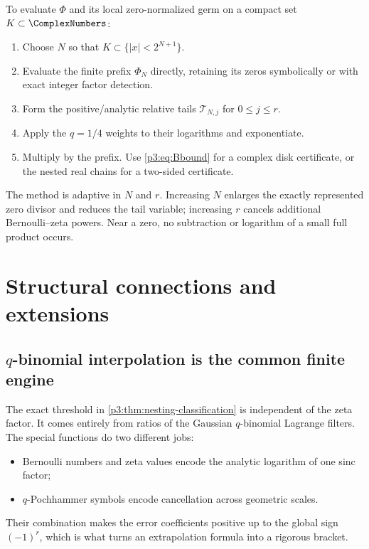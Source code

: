 \documentclass[11pt]{article}
\numberwithin{equation}{section}
\theoremstyle{definition}
\theoremstyle{remark}
\begin{document}
\begin{algorithm}\label{p3:alg:evaluator}
To evaluate $\Phi$ and its local zero-normalized germ on a compact set $K\subset\ComplexNumbers$:
\begin{enumerate}
\item Choose $N$ so that $K\subset\{|x|<2^{N+1}\}$.
\item Evaluate the finite prefix $\Phi_N$ directly, retaining its zeros symbolically or with
      exact integer factor detection.
\item Form the positive/analytic relative tails $\mathcal T_{N,j}$ for $0\le j\le r$.
\item Apply the $q=1/4$ weights to their logarithms and exponentiate.
\item Multiply by the prefix.  Use \eqref{p3:eq:Bbound} for a complex disk certificate, or the
      nested real chains for a two-sided certificate.
\end{enumerate}
\end{algorithm}

The method is adaptive in $N$ and $r$.  Increasing $N$ enlarges the exactly represented zero
divisor and reduces the tail variable; increasing $r$ cancels additional Bernoulli--zeta
powers.  Near a zero, no subtraction or logarithm of a small full product occurs.

\section{Structural connections and extensions}\label{p3:sec:connections}

\subsection{\texorpdfstring{$q$}{q}-binomial interpolation is the common finite engine}

The exact threshold in \cref{p3:thm:nesting-classification} is independent of the zeta factor.
It comes entirely from ratios of the Gaussian $q$-binomial Lagrange filters.  The special
functions do two different jobs:
\begin{itemize}
\item Bernoulli numbers and zeta values encode the analytic logarithm of one sinc factor;
\item $q$-Pochhammer symbols encode cancellation across geometric scales.
\end{itemize}
Their combination makes the error coefficients positive up to the global sign $(-1)^r$,
which is what turns an extrapolation formula into a rigorous bracket.
\end{document}
